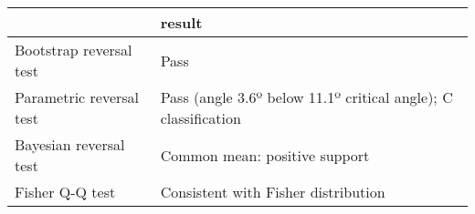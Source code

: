 \begin{tabular}{ll}
\toprule
{} &                                                          result \\
\midrule
Bootstrap reversal test  &                                                            Pass \\
Parametric reversal test &  Pass (angle 3.6º below 11.1º critical angle); C classification \\
Bayesian reversal test   &                                   Common mean: positive support \\
Fisher Q-Q test          &                             Consistent with Fisher distribution \\
\bottomrule
\end{tabular}
